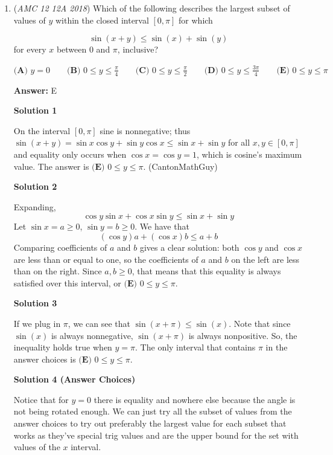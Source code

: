 \begin{enumerate}
 


 


	\item (\textit{AMC 12 12A 2018}) Which of the following describes the largest subset of values of $y$ within the closed interval $[0,\pi]$ for which

 \[\sin(x+y)\leq \sin(x)+\sin(y)\]for every $x$ between $0$ and $\pi$, inclusive?


 $\textbf{(A) } y=0 \qquad \textbf{(B) } 0\leq y\leq \frac{\pi}{4} \qquad \textbf{(C) } 0\leq y\leq \frac{\pi}{2} \qquad \textbf{(D) } 0\leq y\leq \frac{3\pi}{4} \qquad \textbf{(E) } 0\leq y\leq \pi$

 \textbf{Answer: }E



\textbf{Solution 1}

On the interval $[0, \pi]$ sine is nonnegative; thus $\sin(x + y) = \sin x \cos y + \sin y \cos x \le \sin x + \sin y$ for all $x, y \in [0, \pi]$ and equality only occurs when $\cos x = \cos y = 1$, which is cosine's maximum value. The answer is $\boxed{\textbf{(E) } 0\le y\le \pi}$. (CantonMathGuy)

 



\textbf{Solution 2}

Expanding, 
 \[\cos y \sin x + \cos x \sin y \le \sin x + \sin y\] Let $\sin x =a \ge 0$, $\sin y = b \ge 0$. We have that 
 \[(\cos y)a+(\cos x)b \le a+b\] Comparing coefficients of $a$ and $b$ gives a clear solution: both $\cos y$ and $\cos x$ are less than or equal to one, so the coefficients of $a$ and $b$ on the left are less than on the right. Since $a, b \ge 0$, that means that this equality is always satisfied over this interval, or $\boxed{\textbf{(E) } 0\le y\le \pi}$.

 



\textbf{Solution 3}

If we plug in $\pi$, we can see that $\sin(x+\pi) \le \sin(x)$. Note that since $\sin(x)$ is always nonnegative, $\sin(x+\pi)$ is always nonpositive. So, the inequality holds true when $y=\pi$. The only interval that contains $\pi$ in the answer choices is $\boxed{\textbf{(E) } 0\le y\le \pi}$.

 



\textbf{Solution 4 (Answer Choices)}

Notice that for $y=0$ there is equality and nowhere else because the angle is not being rotated enough. We can just try all the subset of values from the answer choices to try out preferably the largest value for each subset that works as they've special trig values and are the upper bound for the set with values of the $x$ interval.


\end{enumerate}
